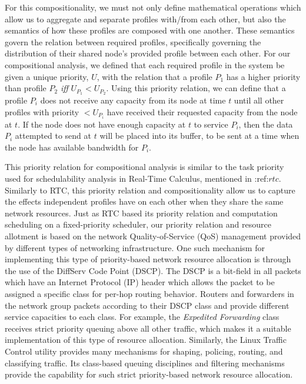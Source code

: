 For this compositionality, we must not only define mathematical
operations which allow us to aggregate and separate profiles with/from
each other, but also the semantics of how these profiles are composed
with one another.  These semantics govern the relation between
required profiles, specifically governing the distribution of their
shared node's provided profile between each other.  For our
compositional analysis, we defined that each required profile in the
system be given a unique priority, $U$, with the relation that a
profile $P_1$ has a higher priority than profile $P_2$
\emph{iff} $U_{P_1} < U_{P_2}$.  Using this priority relation, we can
define that a profile $P_i$ does not receive any capacity from
its node at time $t$ until all other profiles with priority
$< U_{P_i}$ have received their requested capacity from the
node at $t$.  If the node does not have enough capacity at
$t$ to service $P_i$, then the data $P_i$ attempted
to send at $t$ will be placed into its buffer, to be sent at a
time when the node has available bandwidth for $P_i$.

This priority relation for compositional analysis is similar to the
task priority used for schedulability analysis in Real-Time Calculus,
mentioned in :ref:$rtc$.  Similarly to RTC, this priority relation and
compositionality allow us to capture the effects independent profiles
have on each other when they share the same network resources.  Just
as RTC based its priority relation and computation scheduling on a
fixed-priority scheduler, our priority relation and resource allotment
is based on the network Quality-of-Service (QoS) management provided
by different types of networking infrastructure.  One such mechanism
for implementing this type of priority-based network resource
allocation is through the use of the DiffServ Code Point
(DSCP)\cite{rfc2474}.  The DSCP is a bit-field in all packets which
have an Internet Protocol (IP) header which allows the packet to be
assigned a specific class for per-hop routing behavior.  Routers and
forwarders in the network group packets according to their DSCP class
and provide different service capacities to each class.  For example,
the \emph{Expedited Forwarding} \cite{rfc3246} class receives strict
priority queuing above all other traffic, which makes it a suitable
implementation of this type of resource allocation.  Similarly, the
Linux Traffic Control\cite{linux_tc} utility provides many mechanisms
for shaping, policing, routing, and classifying traffic.  Its
class-based queuing disciplines and filtering mechanisms provide the
capability for such strict priority-based network resource
allocation.  

